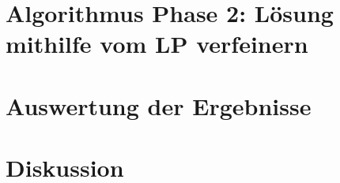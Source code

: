 \section{Algorithmus Phase 2: Lösung mithilfe vom LP verfeinern}
\section{Auswertung der Ergebnisse}
\section{Diskussion}
\clearpage
%
%
%
\printbibliography[heading=bibintoc, title=References]
\clearpage
\listoffigures
\listoftables
